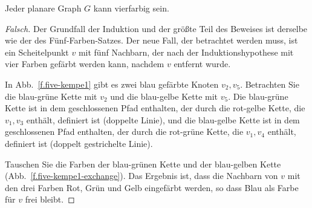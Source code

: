 \begin{theorem}\label{thm.fourcolor}
Jeder planare Graph $G$ kann vierfarbig sein.
\end{theorem}

\begin{proof}[Falsch] Der Grundfall der Induktion und der größte Teil des Beweises ist derselbe wie der des Fünf-Farben-Satzes. Der neue Fall, der betrachtet werden muss, ist ein Scheitelpunkt $v$ mit fünf Nachbarn, der nach der Induktionshypothese mit vier Farben gefärbt werden kann, nachdem $v$ entfernt wurde.

In Abb.~\ref{f.five-kempe1} gibt es zwei blau gefärbte Knoten $v_2,v_5$. Betrachten Sie die blau-grüne Kette mit $v_2$ und die blau-gelbe Kette mit $v_5$. Die blau-grüne Kette ist in dem geschlossenen Pfad enthalten, der durch die rot-gelbe Kette, die $v_1,v_3$ enthält, definiert ist (doppelte Linie), und die blau-gelbe Kette ist in dem geschlossenen Pfad enthalten, der durch die rot-grüne Kette, die $v_1,v_4$ enthält, definiert ist (doppelt gestrichelte Linie).

Tauschen Sie die Farben der blau-grünen Kette und der blau-gelben Kette (Abb.~\ref{f.five-kempe1-exchange}). Das Ergebnis ist, dass die Nachbarn von $v$ mit den drei Farben Rot, Grün und Gelb eingefärbt werden, so dass Blau als Farbe für $v$ frei bleibt.
\end{proof}

